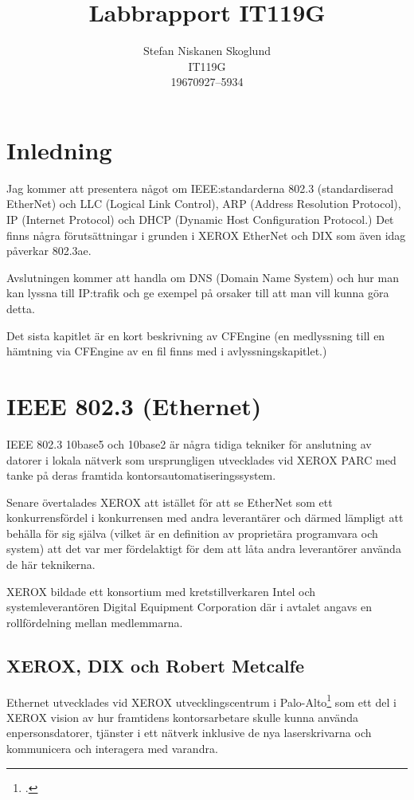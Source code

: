 \documentclass[swedish,10pt,a4paper]{report}
\title{%
  Labbrapport IT119G}
\author{%
  Stefan Niskanen Skoglund\\
  IT119G\\
  19670927--5934}
\begin{document}
\maketitle

\chapter{Inledning}\label{chap:inledning}

Jag kommer att presentera något om IEEE:standarderna 802.3 (standardiserad EtherNet) och LLC (Logical Link Control), ARP (Address Resolution Protocol),
IP (Internet Protocol) och DHCP (Dynamic Host Configuration Protocol.) Det finns några förutsättningar i grunden i XEROX EtherNet och DIX som även idag påverkar 802.3ae.

Avslutningen kommer att handla om DNS (Domain Name System)
och hur man kan lyssna till IP:trafik och ge exempel på orsaker till att man vill kunna göra detta.

Det sista kapitlet är en kort beskrivning av CFEngine (en
medlyssning till en hämtning via CFEngine av en fil
finns med i avlyssningskapitlet.)

\chapter{IEEE 802.3 (Ethernet)}\label{IEEE8023Ethernet}

IEEE 802.3 10base5 och 10base2 är några tidiga tekniker för anslutning
av datorer i lokala nätverk som ursprungligen utvecklades vid XEROX PARC
med tanke på deras framtida kontorsautomatiseringssystem.

Senare övertalades XEROX att istället för att se EtherNet som ett konkurrensfördel
i konkurrensen med andra leverantärer och därmed lämpligt att behålla för sig själva (vilket
är en definition av proprietära programvara och system)
att det var mer fördelaktigt för dem att låta andra leverantörer använda de här teknikerna.

XEROX bildade ett konsortium med kretstillverkaren Intel och systemleverantören
Digital Equipment Corporation där i avtalet angavs en rollfördelning mellan medlemmarna.

\section{XEROX, DIX och Robert Metcalfe }\label{sec:DIX_standard}

Ethernet utvecklades vid XEROX utvecklingscentrum i Palo-Alto\footcite{Pelkey}
som ett del i XEROX vision av hur framtidens kontorsarbetare skulle
kunna använda enpersonsdatorer, tjänster i ett nätverk inklusive de
nya laserskrivarna och kommunicera och interagera med varandra.
\end{document}
